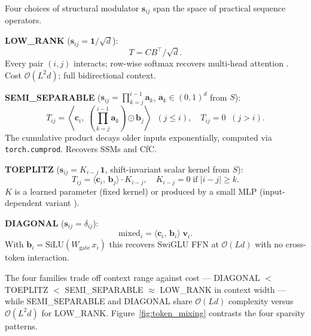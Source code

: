 Four choices of structural modulator $\mathbf{s}_{ij}$ span the space of practical sequence operators.

\textbf{LOW\_RANK} ($\mathbf{s}_{ij} = \mathbf{1}/\sqrt{d}$):
\begin{equation}
  T = CB^\top / \sqrt{d}.
\end{equation}
Every pair $(i,j)$ interacts; row-wise softmax recovers multi-head attention \cite{vaswani2017attention}.
Cost $\mathcal{O}(L^2 d)$; full bidirectional context.

\textbf{SEMI\_SEPARABLE} ($\mathbf{s}_{ij} = \prod_{k=j}^{i-1}\mathbf{a}_k$, $\mathbf{a}_k \in (0,1)^d$ from $S$):
\begin{equation}
  T_{ij} = \left\langle\mathbf{c}_i,\; \left(\prod_{k=j}^{i-1}\mathbf{a}_k\right) \odot \mathbf{b}_j\right\rangle \;\; (j \le i), \quad T_{ij} = 0 \;\; (j > i).
\end{equation}
The cumulative product decays older inputs exponentially, computed via \texttt{torch.cumprod}. Recovers SSMs and CfC.

\textbf{TOEPLITZ} ($\mathbf{s}_{ij} = K_{i-j}\,\mathbf{1}$, shift-invariant scalar kernel from $S$):
\begin{equation}
  T_{ij} = \langle\mathbf{c}_i,\, \mathbf{b}_j\rangle \cdot K_{i-j}, \quad K_{i-j} = 0 \;\text{if}\; |i-j| \ge k.
\end{equation}
$K$ is a learned parameter (fixed kernel) or produced by a small MLP (input-dependent variant \cite{poli2023hyena}).

\textbf{DIAGONAL} ($\mathbf{s}_{ij} = \delta_{ij}$):
\begin{equation}
  \mathrm{mixed}_i = \langle\mathbf{c}_i,\, \mathbf{b}_i\rangle\;\mathbf{v}_i.
\end{equation}
With $\mathbf{b}_i = \mathrm{SiLU}(W_{\mathrm{gate}}\,x_i)$ this recovers SwiGLU FFN \cite{shazeer2020glu} at $\mathcal{O}(Ld)$ with no cross-token interaction.

The four families trade off context range against cost — DIAGONAL $<$ TOEPLITZ $<$ SEMI\_SEPARABLE $\approx$ LOW\_RANK in context width — while SEMI\_SEPARABLE and DIAGONAL share $\mathcal{O}(Ld)$ complexity versus $\mathcal{O}(L^2d)$ for LOW\_RANK.
Figure~\ref{fig:token_mixing} contrasts the four sparsity patterns.

